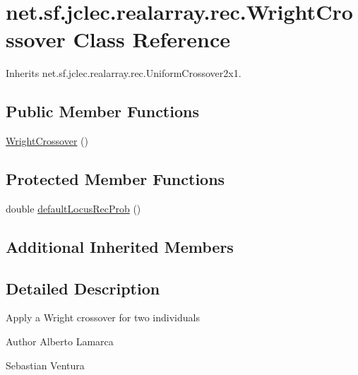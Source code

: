 \hypertarget{classnet_1_1sf_1_1jclec_1_1realarray_1_1rec_1_1_wright_crossover}{\section{net.\-sf.\-jclec.\-realarray.\-rec.\-Wright\-Crossover Class Reference}
\label{classnet_1_1sf_1_1jclec_1_1realarray_1_1rec_1_1_wright_crossover}
}


Inherits net.\-sf.\-jclec.\-realarray.\-rec.\-Uniform\-Crossover2x1.

\subsection*{Public Member Functions}
\begin{DoxyCompactItemize}
\item 
\hyperlink{classnet_1_1sf_1_1jclec_1_1realarray_1_1rec_1_1_wright_crossover_a481a91b4c3ca9ccbf350fec7325cc4b1}{Wright\-Crossover} ()
\end{DoxyCompactItemize}
\subsection*{Protected Member Functions}
\begin{DoxyCompactItemize}
\item 
double \hyperlink{classnet_1_1sf_1_1jclec_1_1realarray_1_1rec_1_1_wright_crossover_a95447cb70cac48e2af733fd8aeb9b11c}{default\-Locus\-Rec\-Prob} ()
\end{DoxyCompactItemize}
\subsection*{Additional Inherited Members}


\subsection{Detailed Description}
Apply a Wright crossover for two individuals

\begin{DoxyAuthor}{Author}
Alberto Lamarca 

Sebastian Ventura 
\end{DoxyAuthor}


